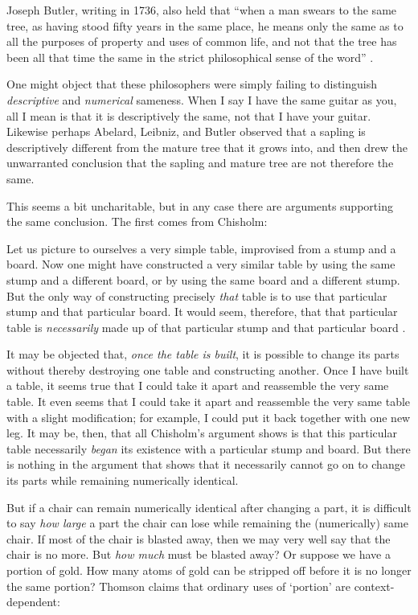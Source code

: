 \documentclass[11pt]{article}
\newenvironment{squote}{%
\begin{spacing}{1}
\begin{list}{}{%
\setlength{\labelwidth}{0pt}%
\rightmargin\leftmargin%
}
\item\relax
}{%
\end{list}%
\end{spacing}
}
\begin{document}
\begin{spacing}{1.5}
Joseph Butler, writing in 1736, also held that ``when a man swears to
the same tree, as having stood fifty years in the same place, he means
only the same as to all the purposes of property and uses of common
life, and not that the tree has been all that time the same in the
strict philosophical sense of the word''
\citeyearpar[100]{butler1975a}.

One might object that these philosophers were simply failing to
distinguish {\em descriptive} and {\em numerical} sameness.  When I
say I have the same guitar as you, all I mean is that it is
descriptively the same, not that I have your guitar.  Likewise perhaps
Abelard, Leibniz, and Butler observed that a sapling is descriptively
different from the mature tree that it grows into, and then drew the
unwarranted conclusion that the sapling and mature tree are not
therefore the same.

This seems a bit uncharitable, but in any case there are arguments
supporting the same conclusion.  The first comes from Chisholm:

\begin{squote}
Let us picture to ourselves a very simple table, improvised from a
stump and a board.  Now one might have constructed a very similar
table by using the same stump and a different board, or by using the
same board and a different stump.  But the only way of constructing
precisely {\em that} table is to use that particular stump and that
particular board.  It would seem, therefore, that that particular
table is {\em necessarily} made up of that particular stump and that
particular board \citeyearpar[146]{chisholm1979}.
\end{squote}

It may be objected that, {\em once the table is built}, it is possible
to change its parts without thereby destroying one table and
constructing another.  Once I have built a table, it seems true that I
could take it apart and reassemble the very same table.  It even seems
that I could take it apart and reassemble the very same table with a
slight modification; for example, I could put it back together with
one new leg.  It may be, then, that all Chisholm's argument shows is
that this particular table necessarily {\em began} its existence with
a particular stump and board.  But there is nothing in the argument
that shows that it necessarily cannot go on to change its parts while
remaining numerically identical.

But if a chair can remain numerically identical after changing a part,
it is difficult to say {\em how large} a part the chair can lose while
remaining the (numerically) same chair.  If most of the chair is
blasted away, then we may very well say that the chair is no more.
But {\em how much} must be blasted away?  Or suppose we have a portion
of gold.  How many atoms of gold can be stripped off before it is no
longer the same portion?  Thomson claims that ordinary uses of
`portion' are context-dependent:


\end{spacing}
\end{document}
